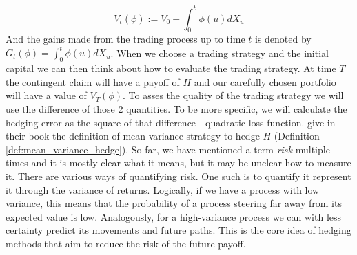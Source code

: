 \documentclass[times, utf8, diplomski]{fer}
\begin{document}
\begin{equation}
	V_t(\phi) := V_0 + \int_0^t \phi(u) dX_u
\end{equation} 
And the gains made from the trading process up to time $t$ is denoted by $G_t(\phi)=\int_0^t \phi(u)dX_u$. When we choose a trading strategy and the initial capital we can then think about how to evaluate the trading strategy. At time $T$ the contingent claim will have a payoff of $H$ and our carefully chosen portfolio will have a value of $V_T(\phi)$. To asses the quality of the trading strategy we will use the difference of those 2 quantities. To be more specific, we will calculate the hedging error as the square of that difference - quadratic loss function. \cite{bingham_risk-neutral_2004} give in their book the definition of mean-variance strategy to hedge $H$ (Definition \ref{def:mean_variance_hedge}). So far, we have mentioned a term \textit{risk} multiple times and it is mostly clear what it means, but it may be unclear how to measure it. There are various ways of quantifying risk. One such is to quantify it represent it through the variance of returns. Logically, if we have a process with low variance, this means that the probability of a process steering far away from its expected value is low. Analogously, for a high-variance process we can with less certainty predict its movements and future paths. This is the core idea of hedging methods that aim to reduce the risk of the future payoff.
\end{document}
